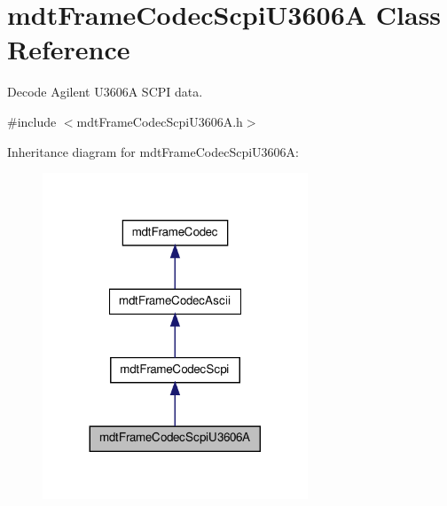 \hypertarget{classmdt_frame_codec_scpi_u3606_a}{\section{mdt\-Frame\-Codec\-Scpi\-U3606\-A Class Reference}
\label{classmdt_frame_codec_scpi_u3606_a}
}


Decode Agilent U3606\-A S\-C\-P\-I data.  




{\ttfamily \#include $<$mdt\-Frame\-Codec\-Scpi\-U3606\-A.\-h$>$}



Inheritance diagram for mdt\-Frame\-Codec\-Scpi\-U3606\-A\-:\nopagebreak
\begin{figure}[H]
\begin{center}
\leavevmode
\includegraphics[width=224pt]{classmdt_frame_codec_scpi_u3606_a__inherit__graph}
\end{center}
\end{figure}


